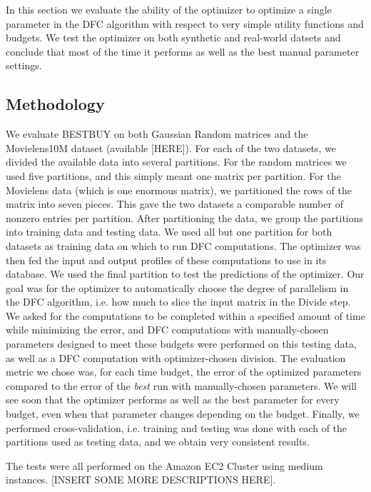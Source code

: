 
In this section we evaluate the ability of the optimizer to optimize a single parameter in the DFC algorithm with respect to very simple utility functions and budgets. We test the optimizer on both synthetic and real-world datsets and conclude that most of the time it performs as well as the best manual parameter settings. 

\subsection{Methodology}

We evaluate BESTBUY on both Gaussian Random matrices and the Movielens10M dataset (available [HERE]). For each of the two datasets, we divided the available data into several partitions. For the random matrices we used five partitions, and this simply meant one matrix per partition. For the Movielens data (which is one enormous matrix), we partitioned the rows of the matrix into seven pieces. This gave the two datasets a comparable number of nonzero entries per partition. After partitioning the data, we group the partitions into training data and testing data. We used all but one partition for both datasets as training data on which to run DFC computations. The optimizer was then fed the input and output profiles of these computations to use in its database. We used the final partition to test the predictions of the optimizer. Our goal was for the optimizer to automatically choose the degree of parallelism in the DFC algorithm, i.e. how much to slice the input matrix in the Divide step. We asked for the computations to be completed within a specified amount of time while minimizing the error, and DFC computations with manually-chosen parameters designed to meet these budgets were performed on this testing data, as well as a DFC computation with optimizer-chosen division. The evaluation metric we chose was, for each time budget, the error of the optimized parameters compared to the error of the \emph{best} run with manually-chosen parameters. We will see soon that the optimizer performs as well as the best parameter for every budget, even when that parameter changes depending on the budget. Finally, we performed cross-validation, i.e. training and testing was done with each of the partitions used as testing data, and we obtain very consistent results. 

The tests were all performed on the Amazon EC2 Cluster using medium instances. [INSERT SOME MORE DESCRIPTIONS HERE]. 


